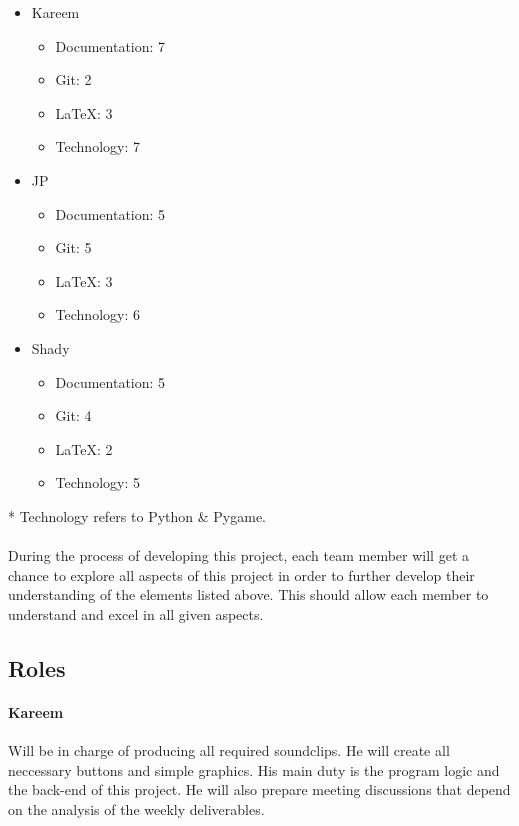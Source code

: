 \documentclass{article}
\begin{document}
\begin{itemize}
\item Kareem
\begin{itemize}
\item Documentation: 7
\item Git: 2
\item LaTeX: 3
\item Technology: 7
\end{itemize}

\item  JP
\begin{itemize}
\item Documentation: 5 
\item Git: 5 
\item LaTeX: 3 
\item Technology: 6
\end{itemize}

\item Shady
\begin{itemize}
\item Documentation: 5 
\item Git: 4 
\item LaTeX: 2 
\item Technology: 5
\end{itemize}
\end{itemize}

* Technology refers to Python \& Pygame.\\
\\
\indent During the process of developing this project, each team member will get a chance to explore all aspects of this project in order to further develop their understanding of the elements listed above. This should allow each member to understand and excel in all given aspects. 


\subsection{Roles}

\paragraph{Kareem\\}

Will be in charge of producing all required soundclips. He will create all neccessary buttons and simple graphics.
His main duty is the program logic and the back-end of this project. He will also prepare meeting discussions that depend on the analysis of the weekly deliverables.
\end{document}
